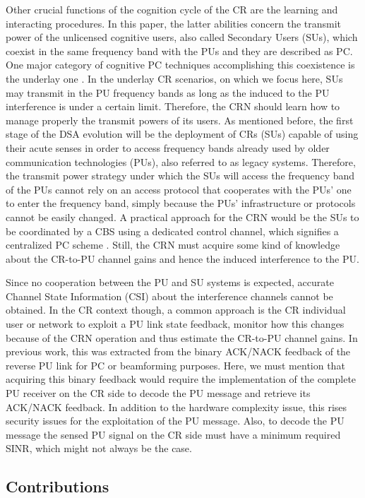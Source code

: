 \documentclass[journal]{IEEEtran}
\begin{document}
Other crucial functions of the cognition cycle of the CR are the learning and interacting procedures. In this paper, the latter abilities concern the transmit power of the unlicensed cognitive users, also called Secondary Users (SUs), which coexist in the same frequency band with the PUs and they are described as PC. One major category of cognitive PC techniques accomplishing this coexistence is the underlay one \cite{biban82}. In the underlay CR scenarios, on which we focus here, SUs may transmit in the PU frequency bands as long as the induced to the PU interference is under a certain limit. Therefore, the CRN should learn how to manage properly the transmit powers of its users. As mentioned before, the first stage of the DSA evolution will be the deployment of CRs (SUs) capable of using their acute senses in order to access frequency bands already used by older communication technologies (PUs), also referred to as legacy systems. Therefore, the transmit power strategy under which the SUs will access the frequency band of the PUs cannot rely on an access protocol that cooperates with the PUs' one to enter the frequency band, simply because the PUs' infrastructure or protocols cannot be easily changed. A practical approach for the CRN would be the SUs to be coordinated by a CBS using a dedicated control channel, which signifies a centralized PC scheme \cite{biban89}. Still, the CRN must acquire some kind of knowledge about the CR-to-PU channel gains and hence the induced interference to the PU.

Since no cooperation between the PU and SU systems is expected, accurate Channel State Information (CSI) about the interference channels cannot be obtained. In the CR context though, a common approach is the CR individual user or network to exploit a PU link state feedback, monitor how this changes because of the CRN operation and thus estimate the CR-to-PU channel gains. In previous work, this was extracted from the binary ACK/NACK feedback of the reverse PU link \cite{biban50, biban52, biban72, biban73} for PC or beamforming purposes. Here, we must mention that acquiring this binary feedback would require the implementation of the complete PU receiver on the CR side to decode the PU message and retrieve its ACK/NACK feedback. In addition to the hardware complexity issue, this rises security issues for the exploitation of the PU message. Also, to decode the PU message the sensed PU signal on the CR side must have a minimum required SINR, which might not always be the case.

\subsection{Contributions}
\end{document}
